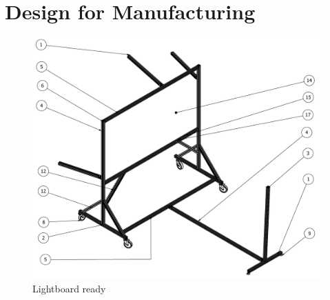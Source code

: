 \documentclass[a4paper]{jpconf}
\begin{document}
\section{Design for Manufacturing}



\begin{figure}
	\centering
	\includegraphics[width=1\linewidth]{frame1.pdf}
	\caption{Lightboard ready}
	\label{fig:Finalprodotype}
\end{figure}
\end{document}
